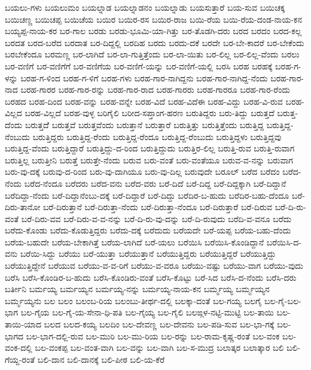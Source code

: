 ಬಯಲು-ಗಳು
ಬಯಲುಮಂ
ಬಯಲ್ನಾಡ
ಬಯಲ್ನಾಡನಂ
ಬಯಲ್ನಾಡು
ಬಯಸುತ್ತಾರೆ
ಬಯ-ಸುವ
ಬಯಿಚಕ್ಕ
ಬಯಿಚಣ್ಣ
ಬಯಿಚಪ್ಪ
ಬಯಿಚೆಯ
ಬಯಿರ
ಬಯಿರ-ರಸ
ಬಯಿರ-ರಾಜ
ಬಯಿ-ರೆಯ
ಬಯಿ-ರೆಯ-ದಂಡ-ನಾಯ-ಕನ
ಬಯ್ಯಪ್ಪ-ನಾಯ-ಕರ
ಬರ-ಗಾಲ
ಬರಡು
ಬರಡು-ಭೂಮಿ-ಯಾ-ಗಿತ್ತು
ಬರ-ತೊಡಗಿ-ದರು
ಬರದ
ಬರದಂ
ಬರದ-ಕಲ್ಲ
ಬರದತ
ಬರದ-ಬರೆದ
ಬರದಾತ
ಬರ-ದಿದ್ದಲ್ಲಿ
ಬರದಿಹ
ಬರದು
ಬರದು-ದಕೆ
ಬರದೇ
ಬರ-ಬೇ-ಕಾದರೆ
ಬರ-ಬೇಕೆಂದು
ಬರಬೇಕೆಂದೂ
ಬರಮಣ್ಣ
ಬರ-ಲಾಗಿದೆ
ಬರ-ಲಾ-ಗುತ್ತಿತ್ತೆಂದು
ಬರ-ಲಾ-ಯಿತು
ಬರ-ಲಿಲ್ಲ
ಬರ-ಲಿಲ್ಲ-ವೆಂದು
ಬರಲು
ಬರ-ವಣಿಗೆ
ಬರ-ವಣಿಗೆಗೆ
ಬರ-ವಣಿಗೆಯ
ಬರ-ವಣಿಗೆ-ಯನ್ನು
ಬರ-ವಣಿಗೆ-ಯಲ್ಲಿ
ಬರಸಿ
ಬರಹ
ಬರಹಕ್ಕೆ
ಬರಹ-ಗ-ಳನ್ನು
ಬರಹ-ಗ-ಳಿಂದ
ಬರಹ-ಗ-ಳಿಗೆ
ಬರಹ-ಗಳು
ಬರಹ-ಗಾರ-ನಾಗಿದ್ದನು
ಬರಹ-ಗಾರ-ನಾಗಿದ್ದ-ನೆಂದು
ಬರಹ-ಗಾರ-ನಾದ
ಬರಹ-ಗಾರರ
ಬರಹ-ಗಾರ-ರನ್ನು
ಬರಹ-ಗಾರ-ರಾದ
ಬರಹ-ಗಾರರು
ಬರಹ-ಗಾರರೂ
ಬರಹ-ಗಾರ-ರೆಂದು
ಬರಹದ
ಬರಹ-ದಿಂದ
ಬರಹ-ವನ್ನು
ಬರಹ-ವನ್ನೇ
ಬರಹ-ವಿದೆ
ಬರಹ-ವಿದೆಈ
ಬರಹ-ವಿದ್ದು
ಬರಹ-ವಿ-ರುವ
ಬರಹ-ವಿಲ್ಲದ
ಬರಹ-ವಿಲ್ಲದೆ
ಬರಹ-ವುಳ್ಳ
ಬರಿಗೈಲಿ
ಬರೀದ-ಸಪ್ತಾಂಗ-ಹರಣ
ಬರುತಿದ್ದರು
ಬರು-ತಿದ್ದು
ಬರುತ್ತದೆ
ಬರುತ್ತ-ದೆಂದು
ಬರುತ್ತದೆೆ
ಬರುತ್ತವೆ
ಬರುತ್ತವೆಂದು
ಬರುತ್ತಾನೆ
ಬರುತ್ತಾರೆ
ಬರುತ್ತಿತ್ತು
ಬರುತ್ತಿತ್ತೆಂದು
ಬರುತ್ತಿದ್ದ
ಬರುತ್ತಿದ್ದ-ನೆಂಬುದು
ಬರುತ್ತಿದ್ದರು
ಬರುತ್ತಿದ್ದ-ರೆಂದು
ಬರುತ್ತಿದ್ದ-ರೆಂದೂ
ಬರುತ್ತಿದ್ದ-ರೆಂಬುದು
ಬರುತ್ತಿದ್ದಳು
ಬರುತ್ತಿದ್ದವು
ಬರುತ್ತಿದ್ದ-ವೆಂದು
ಬರುತ್ತಿದ್ದಾರೆ
ಬರುತ್ತಿದ್ದು-ದ-ರಿಂದ
ಬರುತ್ತಿದ್ದುದು
ಬರುತ್ತಿರ-ಲಿಲ್ಲ
ಬರುತ್ತಿ-ರುವ
ಬರುತ್ತಿ-ರುವಾಗ
ಬರುತ್ತಿಲ್ಲ
ಬರುತ್ತೀನಿ
ಬರುತ್ತೆ
ಬರುತ್ತೇ-ನೆಂದು
ಬರುವ
ಬರು-ವಂತೆ
ಬರು-ವಂತೆಯೂ
ಬರುವ-ವ-ನನ್ನು
ಬರುವಾಗ
ಬರು-ವು-ದಕ್ಕೆ
ಬರುವು-ದ-ರಿಂದ
ಬರು-ವು-ದಾಗಿಯೂ
ಬರು-ವು-ದಿಲ್ಲ
ಬರುವುದೇ
ಬರೂಲ್
ಬರೆದ
ಬರೆದಂ
ಬರೆದ-ನೆಂದು
ಬರೆದ-ನೆಂದೂ
ಬರೆದರು
ಬರೆದ-ವನು
ಬರೆದ-ವರು
ಬರೆ-ದಿದೆ
ಬರೆ-ದಿದ್ದ
ಬರೆ-ದಿದ್ದಕ್ಕಾಗಿ
ಬರೆ-ದಿದ್ದಾನೆ
ಬರೆದಿದ್ದಾ-ನೆಂದು
ಬರೆ-ದಿದ್ದಾನೆಂಬು-ದಕ್ಕೆ
ಬರೆ-ದಿದ್ದಾರೆ
ಬರೆ-ದಿದ್ದು
ಬರೆದಿರ-ಬ-ಹುದು
ಬರೆದಿರ-ಬಹು-ದೆಂದೂ
ಬರೆ-ದಿರು-ತಾನೋ
ಬರೆ-ದಿರುತ್ತಾನೆ
ಬರೆ-ದಿರುತ್ತಾ-ನೆಂದು
ಬರೆ-ದಿರುತ್ತಾ-ನೆಂದೂ
ಬರೆ-ದಿರುತ್ತಾರೆ
ಬರೆ-ದಿರುವ
ಬರೆ-ದಿ-ರು-ವಂತೆ
ಬರೆ-ದಿರು-ವವ
ಬರೆ-ದಿರು-ವ-ವ-ನನ್ನು
ಬರೆ-ದಿ-ರು-ವು-ದನ್ನು
ಬರೆ-ದಿ-ರುವುದು
ಬರೆದಿ-ವ-ವನೂ
ಬರೆದು
ಬರೆದು-ಕೊಂಡು
ಬರೆದು-ಕೊಡುತ್ತಿದ್ದರು
ಬರೆದು-ದಕ್ಕೆ
ಬರೆದುದು
ಬರೆಯದೇ
ಬರೆ-ಯಪ್ಪ
ಬರೆಯ-ಬಹು-ದೆಂದು
ಬರೆಯ-ಬಹುದೇ
ಬರೆಯ-ಬೇಕಾಗಿತ್ತೆ
ಬರೆಯ-ಲಾಗಿದೆ
ಬರೆ-ಯಲು
ಬರೆಯಿಸಿ
ಬರೆಯಿಸಿ-ಕೊಂಡಿದ್ದಾನೆ
ಬರೆಯಿಸಿ-ದ-ವನು
ಬರೆಯಿ-ಸಿದ್ದು
ಬರೆಯು
ಬರೆ-ಯುತ್ತಾ
ಬರೆಯುತ್ತಾನೆ
ಬರೆಯುತ್ತಿದ್ದರು
ಬರೆಯುತ್ತಿದ್ದರೆ
ಬರೆಯುತ್ತಿದ್ದು
ಬರೆಯುತ್ತಿದ್ದೇನೆ
ಬರೆಯುವ
ಬರೆಯು-ವ-ವ-ರಿಗೆ
ಬರೆಯು-ವ-ವರೂ
ಬರೆಯು-ವಷ್ಟು
ಬರೆಯು-ವಾಗ
ಬರೆಯು-ವುದು
ಬರೆಸಿ
ಬರೆಸಿ-ಕೊಂಡಿರ-ಬ-ಹುದು
ಬರೆಸಿ-ಕೊಂಡಿರು-ವಂತೆ
ಬರೆಸಿ-ಕೊಟ್ಟು
ಬರೆ-ಸಿದ
ಬರೆಸಿ-ದ-ನೆಂದು
ಬರೆಸಿ-ದರು
ಬರ್ತೀನಿ
ಬರ್ಮಯ್ಯ
ಬರ್ಮಯ್ಯನ
ಬರ್ಮಯ್ಯ-ನನ್ನು
ಬರ್ಮಯ್ಯ-ನಾಯ-ಕನ
ಬರ್ಮ್ಮಯ್ಯ
ಬರ್ಮ್ಮಯ್ಯನ
ಬರ್ಮ್ಮಯ್ಯನು
ಬಲ
ಬಲಂ
ಬಲಂಬ-ರಿಯ
ಬಲಂಬು-ತೀರ್ಥ-ದಲ್ಲಿ
ಬಲಕ್ಕಾ-ದಂತೆ
ಬಲ-ಗಯ್ಯ
ಬಲಗೈ
ಬಲ-ಗೈ-ಬಲ-ಭಾಗ
ಬಲ-ಗೈಯ
ಬಲ-ಗೈ-ಯ-ಸೇನಾ-ಧಿ-ಪತಿ
ಬಲ-ಗೈಯ್ಯ
ಬಲ-ಗೈಲಿ
ಬಲಙ್ಗಳ-ನಟ್ಟಿ-ಮುಟ್ಟಿ
ಬಲ-ತಾಯಿ
ಬಲ-ತಾಯಿ-ಯಾದ
ಬಲದ
ಬಲದ-ಕಯ್ಯ
ಬಲದಿಂ
ಬಲ-ದೇವಣ್ಣ
ಬಲ-ದೇವನು
ಬಲ-ಪಡಿ-ಸುವ
ಬಲ-ಭಾ-ಗಕ್ಕೆ
ಬಲ-ಭಾಗದ
ಬಲ-ಭಾಗ-ದಲ್ಲಿ-ರುವ
ಬಲ-ಮುರಿ
ಬಲ-ಮು-ರಿಯ
ಬಲ-ರನ್ನು
ಬಲ-ರಾಮ-ಕೃಷ್ಣ-ರಂತೆ
ಬಲ-ವಂಕ
ಬಲ-ವಂಕ-ದಲ್ಲಿ
ಬಲ-ವಂಕಪ್ಪ
ಬಲ-ವಂತ-ವಾಗಿ
ಬಲ-ವನ್ನು
ಬಲ-ವಾಗಿ
ಬಲ-ಸ-ಮುದ್ರ
ಬಲಾತ್ಕರ
ಬಲಾತ್ಕಾರ
ಬಲಿ
ಬಲಿ-ಗೆಯ್ದ-ರಂತೆ
ಬಲಿ-ದಾನ
ಬಲಿ-ದಾನಕ್ಕೆ
ಬಲಿ-ಪೀಠ
ಬಲಿ-ಯ-ಕೆರೆ
